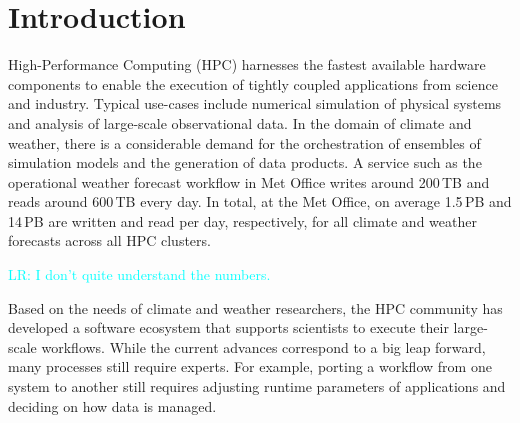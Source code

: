 \documentclass{superfri}
\newcommand{\jk}[1]{\todo[inline]{JK: #1}}
\newcommand{\lr}[1]{\textcolor{cyan}{LR: #1}}
\newcommand{\bnl}[1]{\textcolor{green}{BNL: #1}}
\begin{document}
\section*{Introduction}
\label{sec:intro}

High-Performance Computing (HPC) harnesses the fastest available hardware components to enable the execution of tightly coupled applications from science and industry.
Typical use-cases include numerical simulation of physical systems and analysis of large-scale observational data.
In the domain of climate and weather, there is a considerable demand for the orchestration of ensembles of simulation models and the generation of data products.
A service such as the operational weather forecast workflow in Met Office writes around 200\,TB and reads around 600\,TB every day.
In total, at the Met Office, on average 1.5\,PB and 14\,PB are written and read per day, respectively, for all climate and weather forecasts across all HPC clusters.

\lr{I don't quite understand the numbers.}

Based on the needs of climate and weather researchers, the HPC community has developed a software ecosystem that supports scientists to execute their large-scale workflows.
While the current advances correspond to a big leap forward, many processes still require experts.
For example, porting a workflow from one system to another still requires adjusting runtime parameters of applications and deciding on how data is managed.

\end{document}
